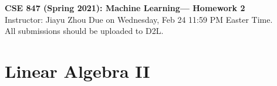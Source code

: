 \documentclass[11pt]{article}
\begin{document}
\thispagestyle {empty}

\newcommand{\lsp}[1]{\large\renewcommand{\baselinestretch}{#1}\normalsize}
\newcommand{\hsp}{\hspace{.2in}}
\newcommand{\comment}[1]{}
\newtheorem{thm}{Theorem}[section]
\newtheorem{lem}{Lemma}[section]
\newtheorem{cor}{Corollary}[section]
\newtheorem{prop}{Proposition}[section]
\newtheorem{problem}{Problem}[section]

\newcommand{\R}{{\rm\hbox{I\kern-.15em R}}}
\newcommand{\IR}{{\rm\hbox{I\kern-.15em R}}}
\newcommand{\IN}{{\rm\hbox{I\kern-.15em N}}}
\newcommand{\IZ}{{\sf\hbox{Z\kern-.40em Z}}}
\newcommand{\IS}{{\rm\hbox{S\kern-.45em S}}}
\newcommand{\Real}{I\!\!R}


\newcommand{\linesep}{\vspace{.2cm}\hrule\vspace{0.2cm}}
\newcommand{\categorysep}{\vspace{0.5cm}}
\newcommand{\entrysep}{\vspace{0cm}}

\newcommand{\category}[1]{\categorysep
                  \noindent {\bf \large #1}
              \linesep}

\pagestyle{empty}

\begin{center}
{\large \textbf{CSE 847 (Spring 2021): Machine Learning--- Homework 2}} \\
 Instructor: Jiayu Zhou \quad
 Due on Wednesday, Feb 24 11:59 PM Easter Time. \\
 All submissions should be uploaded to D2L.
\end{center}

\section{Linear Algebra II}
\end{document}
